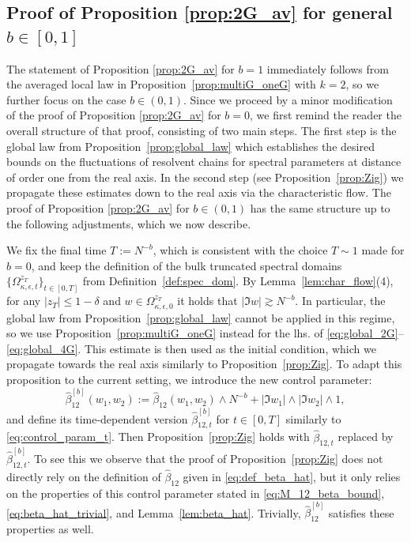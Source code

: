 \documentclass[10pt]{amsart}
\numberwithin{equation}{section}
\begin{document}
\subsection{Proof of Proposition \ref{prop:2G_av} for general $b\in [0,1]$}\label{sec:general_b} 
The statement of Proposition \ref{prop:2G_av} for $b=1$ immediately follows from the averaged local law in Proposition~\ref{prop:multiG_oneG} with $k=2$, so we further focus on the case $b\in (0,1)$. Since we proceed by a minor modification of the proof of Proposition \ref{prop:2G_av} for $b=0$, we first remind the reader the overall structure of that proof, consisting of two main steps. The first step is the global law from Proposition~\ref{prop:global_law} which establishes the desired bounds on the fluctuations of resolvent chains for spectral parameters at distance of order one from the real axis. In the second step (see Proposition~\ref{prop:Zig}) we propagate these estimates down to the real axis via the characteristic flow. The proof of Proposition \ref{prop:2G_av} for $b\in (0,1)$ has the same structure up to the following adjustments, which we now describe.

We fix the final time $T:=N^{-b}$, which is consistent with the choice $T\sim 1$ made for $b=0$, and keep the definition of the bulk truncated spectral domains $\{\Omega_{\kappa,\epsilon,t}^{z_T}\}_{t\in [0,T]}$ from Definition~\ref{def:spec_dom}. By Lemma~\ref{lem:char_flow}(4), for any $|z_T|\le 1-\delta$ and $w\in \Omega_{\kappa,\epsilon,0}^{z_T}$ it holds that $|\Im w|\gtrsim N^{-b}$. In particular, the global law from Proposition~\ref{prop:global_law} cannot be applied in this regime, so we use Proposition~\ref{prop:multiG_oneG} instead for the lhs. of \eqref{eq:global_2G}--\eqref{eq:global_4G}. This estimate is then used as the initial condition, which we propagate towards the real axis similarly to Proposition~\ref{prop:Zig}. To adapt this proposition to the current setting, we introduce the new control parameter:
\begin{equation}
\widehat{\beta}^{[b]}_{12}(w_1,w_2):=\widehat{\beta}_{12}(w_1,w_2)\wedge N^{-b} + |\Im w_1|\wedge|\Im w_2|\wedge 1,
\label{eq:beta_hat_b}
\end{equation}
and define its time-dependent version $\widehat{\beta}^{[b]}_{12,t}$ for $t\in [0,T]$ similarly to \eqref{eq:control_param_t}. Then Proposition~\ref{prop:Zig} holds with $\widehat{\beta}_{12,t}$ replaced by $\widehat{\beta}_{12,t}^{[b]}$. To see this we observe that the proof of Proposition~\ref{prop:Zig} does not directly rely on the definition of $\widehat{\beta}_{12}$ given in \eqref{eq:def_beta_hat}, but it only relies on the properties of this control parameter stated in \eqref{eq:M_12_beta_bound}, \eqref{eq:beta_hat_trivial}, and Lemma~\ref{lem:beta_hat}. Trivially, $\widehat{\beta}_{12}^{[b]}$ satisfies these properties as well.
\end{document}

